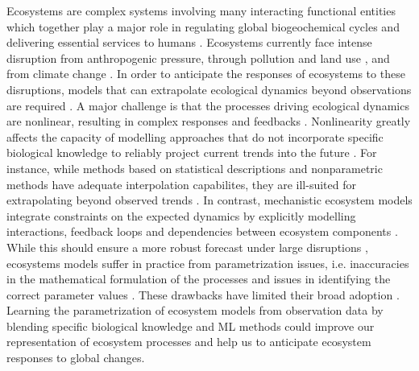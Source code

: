 Ecosystems are complex systems involving many interacting functional entities which together play a major role in regulating global biogeochemical cycles \citep{Bonan2008} and delivering essential services to humans \citep{Kremen2005}.
%
Ecosystems currently face intense disruption from anthropogenic pressure, through pollution and land use \citep{Doney2010,Ellis2011}, and from climate change \citep{Midgley2019}. In order to anticipate the responses of ecosystems to these disruptions, models that can extrapolate ecological dynamics beyond observations are required \citep{Boyd2012}. 
%
A major challenge is that the processes driving ecological dynamics are nonlinear, resulting in complex responses and feedbacks \citep{Scheffer2001}. Nonlinearity greatly affects the capacity of modelling approaches that do not incorporate specific biological knowledge to reliably project current trends into the future \citep{Barnosky2012}. For instance, while methods based on statistical descriptions \citep{Deneu2021} and nonparametric methods \citep{Ye2015,Ye2016,Deyle2016} have adequate interpolation capabilites, they are ill-suited for extrapolating beyond observed trends \citep{Barnosky2012,Urban2016}.
%
In contrast, mechanistic ecosystem models integrate constraints on the expected dynamics by explicitly modelling interactions, feedback loops and dependencies between ecosystem components \citep{Geary2020}. While this should ensure a more robust forecast under large disruptions \citep{Norberg2012}, ecosystems models suffer in practice from parametrization issues, i.e. inaccuracies in the mathematical formulation of the processes and issues in identifying the correct parameter values \citep{DeAngelis2015}. These drawbacks have limited their broad adoption \citep{Urban2016}.
%
Learning the parametrization of ecosystem models from observation data by blending specific biological knowledge and ML methods could improve our representation of ecosystem processes and help us to anticipate ecosystem responses to global changes.

